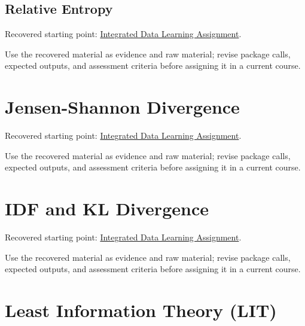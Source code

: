 \documentclass[
  letterpaper,
]{scrbook}
\begin{document}
\subsection*{Relative Entropy}\label{sec-pr-05-relative-entropy}

Recovered starting point:
\hyperref[sec-lab-integrated-learning-assignment]{Integrated Data
Learning Assignment}.

Use the recovered material as evidence and raw material; revise package
calls, expected outputs, and assessment criteria before assigning it in
a current course.

\section*{Jensen-Shannon
Divergence}\label{sec-pr-05-jensen-shannon-divergence}


Recovered starting point:
\hyperref[sec-lab-integrated-learning-assignment]{Integrated Data
Learning Assignment}.

Use the recovered material as evidence and raw material; revise package
calls, expected outputs, and assessment criteria before assigning it in
a current course.

\section*{IDF and KL Divergence}\label{sec-pr-05-idf-and-kl-divergence}


Recovered starting point:
\hyperref[sec-lab-integrated-learning-assignment]{Integrated Data
Learning Assignment}.

Use the recovered material as evidence and raw material; revise package
calls, expected outputs, and assessment criteria before assigning it in
a current course.

\section*{Least Information Theory
(LIT)}\label{sec-pr-05-least-information-theory-lit}

\end{document}

